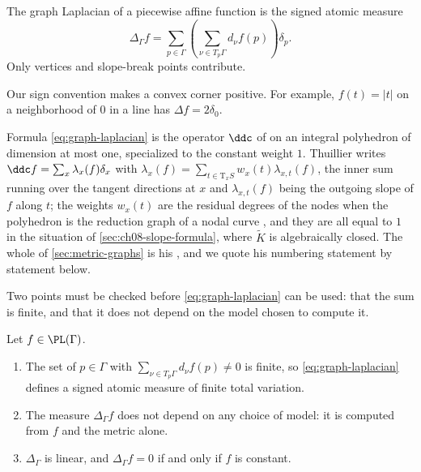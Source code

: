 \begin{definition}
\label{def:ch08-graph-laplacian}
The graph Laplacian of a piecewise affine function is the signed atomic
measure
\begin{equation}
\label{eq:graph-laplacian}
             \Delta_\Gamma f
             =\sum_{p\in\Gamma}
                \left(\sum_{\nu\in T_p\Gamma}d_\nu f(p)\right)\delta_p.
\end{equation}
Only vertices and slope-break points contribute.
\end{definition}

Our sign convention makes a convex corner positive.  For example,
$f(t)=|t|$ on a neighborhood of $0$ in a line has
$\Delta f=2\delta_0$.

Formula \eqref{eq:graph-laplacian} is the operator $\ddc$ of
\cite[\S1.2.1]{Thu05} on an integral polyhedron of dimension at most one,
specialized to the constant weight $1$.  Thuillier writes
$\ddc f=\sum_{x}\lambda_x(f)\delta_x$ with
$\lambda_x(f)=\sum_{t\in\mathrm T_xS}w_x(t)\lambda_{x,t}(f)$, the inner sum
running over the tangent directions at $x$ and $\lambda_{x,t}(f)$ being the
outgoing slope of $f$ along $t$; the weights $w_x(t)$ are the residual degrees
of the nodes when the polyhedron is the reduction graph of a nodal curve
\cite[Rem.~1.2.4]{Thu05}, and they are all equal to $1$ in the situation of
\cref{sec:ch08-slope-formula}, where $\widetilde K$ is algebraically closed.
The whole of \cref{sec:metric-graphs} is his \cite[\S1.2]{Thu05}, and we
quote his numbering statement by statement below.

Two points must be checked before \eqref{eq:graph-laplacian} can be used:
that the sum is finite, and that it does not depend on the model chosen to
compute it.

\begin{lemma}
\label{lem:ch08-laplacian-well-defined}
Let $f\in\PL(\Gamma)$.
\begin{enumerate}
\item The set of $p\in\Gamma$ with
$\sum_{\nu\in T_p\Gamma}d_\nu f(p)\neq0$ is finite, so
\eqref{eq:graph-laplacian} defines a signed atomic measure of finite total
variation.
\item The measure $\Delta_\Gamma f$ does not depend on any choice of model:
it is computed from $f$ and the metric alone.
\item $\Delta_\Gamma$ is linear, and $\Delta_\Gamma f=0$ if and only if $f$
is constant.
\end{enumerate}
\end{lemma}

